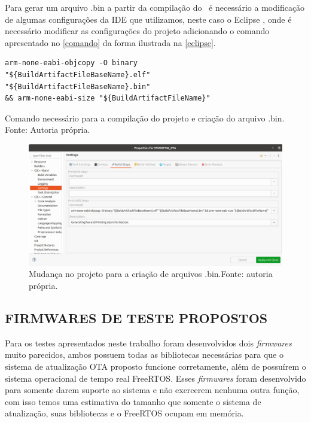 Para gerar um arquivo .bin a partir da compilação do \firmware\ é necessário a modificação de algumas configurações da IDE que utilizamos, neste caso o Eclipse \cite{Eclipse}, onde é necessário modificar as configurações do projeto adicionando o comando apresentado no \autoref{comando} da forma ilustrada na \autoref{eclipse}.

\begin{algorithm}[H]
\begin{lstlisting}
arm-none-eabi-objcopy -O binary
"${BuildArtifactFileBaseName}.elf"
"${BuildArtifactFileBaseName}.bin"
&& arm-none-eabi-size "${BuildArtifactFileName}"

\end{lstlisting}
\caption{Comando necessário para a compilação do projeto e criação do arquivo .bin.
\newline Fonte: Autoria própria.}
\label{comando}
\end{algorithm}

\begin{figure}[H]
    \scriptsize
     \centering
     \includegraphics[scale=0.453]{dados/figuras/eclipse.png}
     \caption{Mudança no projeto para a criação de arquivos .bin.\newline Fonte: autoria própria.}
     \label{eclipse}
\end{figure}

\subsection {FIRMWARES DE TESTE PROPOSTOS}
Para os testes apresentados neste trabalho foram desenvolvidos dois \textit{firmwares} muito parecidos, ambos possuem todas as bibliotecas necessárias para que o sistema de atualização OTA proposto funcione corretamente, além de possuírem o sistema operacional de tempo real FreeRTOS. Esses \textit{firmwares} foram desenvolvido para somente darem suporte ao sistema e não exercerem nenhuma outra função, com isso temos uma estimativa do tamanho que somente o sistema de atualização, suas bibliotecas e o FreeRTOS ocupam em memória.

